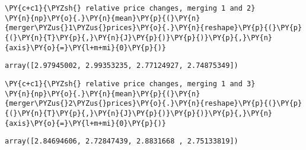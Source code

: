     \begin{tcolorbox}[breakable, size=fbox, boxrule=1pt, pad at break*=1mm,colback=cellbackground, colframe=cellborder]
\begin{Verbatim}[commandchars=\\\{\}]
\PY{c+c1}{\PYZsh{} relative price changes, merging 1 and 2}
\PY{n}{np}\PY{o}{.}\PY{n}{mean}\PY{p}{(}\PY{n}{merger\PYZus{}1\PYZus{}prices}\PY{o}{.}\PY{n}{reshape}\PY{p}{(}\PY{p}{(}\PY{n}{T}\PY{p}{,}\PY{n}{J}\PY{p}{)}\PY{p}{)}\PY{p}{,}\PY{n}{axis}\PY{o}{=}\PY{l+m+mi}{0}\PY{p}{)}
\end{Verbatim}
\end{tcolorbox}

            \begin{tcolorbox}[breakable, size=fbox, boxrule=.5pt, pad at break*=1mm, opacityfill=0]
\begin{Verbatim}[commandchars=\\\{\}]
array([2.97945002, 2.99353235, 2.77124927, 2.74875349])
\end{Verbatim}
\end{tcolorbox}

    \begin{tcolorbox}[breakable, size=fbox, boxrule=1pt, pad at break*=1mm,colback=cellbackground, colframe=cellborder]
\begin{Verbatim}[commandchars=\\\{\}]
\PY{c+c1}{\PYZsh{} relative price changes, merging 1 and 3}
\PY{n}{np}\PY{o}{.}\PY{n}{mean}\PY{p}{(}\PY{n}{merger\PYZus{}2\PYZus{}prices}\PY{o}{.}\PY{n}{reshape}\PY{p}{(}\PY{p}{(}\PY{n}{T}\PY{p}{,}\PY{n}{J}\PY{p}{)}\PY{p}{)}\PY{p}{,}\PY{n}{axis}\PY{o}{=}\PY{l+m+mi}{0}\PY{p}{)}
\end{Verbatim}
\end{tcolorbox}

            \begin{tcolorbox}[breakable, size=fbox, boxrule=.5pt, pad at break*=1mm, opacityfill=0]
\begin{Verbatim}[commandchars=\\\{\}]
array([2.84694606, 2.72847439, 2.8831668 , 2.75133819])
\end{Verbatim}
\end{tcolorbox}

